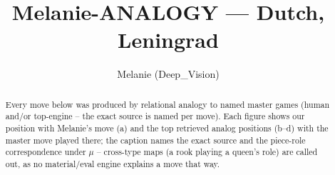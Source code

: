 \documentclass[11pt]{article}
\title{Melanie-ANALOGY — Dutch, Leningrad}
\author{Melanie (Deep\_Vision)}
\date{}
\begin{document}
\maketitle

\begin{abstract}Every move below was produced by relational analogy to named master games (human and/or top-engine -- the exact source is named per move). Each figure shows our position with Melanie's move (a) and the top retrieved analog positions (b--d) with the master move played there; the caption names the exact source and the piece-role correspondence under $\mu$ -- cross-type maps (a rook playing a queen's role) are called out, as no material/eval engine explains a move that way.\end{abstract}

\begin{figure}[p]\centering
\begin{subfigure}{0.46\textwidth}\centering
\resizebox{\linewidth}{!}{%
\newchessgame
\chessboard[
  setfen={rnbq1rk1/ppp1p1bp/3p1np1/5p2/2PP3P/5NP1/PP2PPB1/RNBQ1RK1 b - - 0 7},
  showmover=false,
  pgfstyle=straightmove, color=movearrow, markmove={a7-a6}
]}
\caption{}
\end{subfigure}\hfill
\begin{subfigure}{0.46\textwidth}\centering
\resizebox{\linewidth}{!}{%
\newchessgame
\chessboard[
  setfen={rnbqk2r/ppp1p1bp/3p1np1/5p2/2PP4/5NP1/PP2PPBP/RNBQ1RK1 b kq - 1 6},
  showmover=false,
  pgfstyle=straightmove, color=movearrow, markmove={c7-c6}
]}
\caption{}
\end{subfigure}
\\[4pt]
\begin{subfigure}{0.46\textwidth}\centering
\resizebox{\linewidth}{!}{%
\newchessgame
\chessboard[
  setfen={rnbqk2r/ppp1p1bp/3p1np1/5p2/2PP4/5NP1/PP2PPBP/RNBQ1RK1 b kq - 0 6},
  showmover=false,
  pgfstyle=straightmove, color=movearrow, markmove={c7-c6}
]}
\caption{}
\end{subfigure}\hfill
\begin{subfigure}{0.46\textwidth}\centering
\resizebox{\linewidth}{!}{%
\newchessgame
\chessboard[
  setfen={rnbq1rk1/ppp1ppbp/3p1np1/8/2PP4/5NP1/PP2PPBP/RNBQ1RK1 b - - 4 6},
  showmover=false,
  pgfstyle=straightmove, color=movearrow, markmove={c7-c6}
]}
\caption{}
\end{subfigure}

\end{figure}
\end{document}

